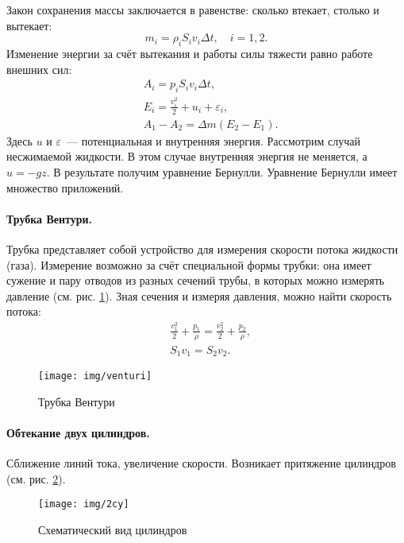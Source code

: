 Закон сохранения массы заключается в равенстве: сколько втекает, столько и вытекает:
\begin{equation}
m _ { i } = \rho _ { i } S _ { i } v _ { i } \Delta t , \quad i = 1,2.
\end{equation}
Изменение энергии за счёт вытекания и работы силы тяжести равно работе внешних сил:
\begin{equation}\begin{aligned}
& A _ { i } = p _ { i } S _ { i } v _ { i } \Delta t, \\
& E _ { i } = \frac { v _ { i }^2 } { 2 } + u _ { i } + \varepsilon _ { i }, \\
& A _ { 1 } - A _ { 2 } = \Delta m \left( E _ { 2 } - E _ { 1 } \right).
\end{aligned}\end{equation}
Здесь $u$ и $\varepsilon$~--- потенциальная и внутренняя энергия. Рассмотрим случай несжимаемой жидкости. В этом случае внутренняя энергия не меняется, а $ u = - g z $. В результате получим уравнение Бернулли.
\vskip 5pt
Уравнение Бернулли имеет множество приложений.
\paragraph{Трубка Вентури.}
 Трубка представляет собой устройство для измерения скорости потока жидкости (газа). Измерение возможно за счёт специальной формы трубки: она имеет сужение и пару отводов из разных сечений трубы, в которых можно измерять давление (см. рис. \ref{fig:venturi}). Зная сечения и измеряя давления, можно найти скорость потока:
\begin{equation}\begin{aligned}
& \frac { v _ { 1 }^2 } { 2 } + \frac { p _ { 1 } } { \rho } = \frac { v _ { 2 }^2 } { 2 } + \frac { p _ { 2 } } { \rho }, \\
& S _ { 1 } v _ { 1 } = S _ { 2 } v _ { 2 }.
\end{aligned}\end{equation}
\begin{figure}[H]
	\centering
	\texttt{[image: img/venturi]}
	\caption{Трубка Вентури}
	\label{fig:venturi}
\end{figure}


\paragraph{Обтекание двух цилиндров.}
Сближение линий тока, увеличение скорости. Возникает притяжение цилиндров (см. рис. \ref{fig:2cy}).
\begin{figure}[H]
	\centering
	\texttt{[image: img/2cy]}
	\caption{Схематический вид цилиндров}
	\label{fig:2cy}
\end{figure}
